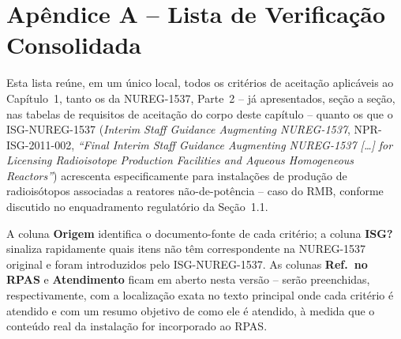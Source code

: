 \hypertarget{apA}{}%
\section*{Ap\^endice A -- Lista de Verifica\c{c}\~ao Consolidada}
\label{sec:apendice-a}

Esta lista re\'une, em um \'unico local, todos os crit\'erios de
aceita\c{c}\~ao aplic\'aveis ao Cap\'itulo~1, tanto os da NUREG-1537,
Parte~2 \citep{nureg1537p2} -- j\'a apresentados, se\c{c}\~ao a se\c{c}\~ao,
nas tabelas de requisitos de aceita\c{c}\~ao do corpo deste cap\'itulo --
quanto os que o ISG-NUREG-1537 (\emph{Interim Staff Guidance Augmenting
NUREG-1537}, NPR-ISG-2011-002, \emph{``Final Interim Staff Guidance
Augmenting NUREG-1537 [\ldots] for Licensing Radioisotope Production
Facilities and Aqueous Homogeneous Reactors''})
acrescenta especificamente para instala\c{c}\~oes de produ\c{c}\~ao de
radiois\'otopos associadas a reatores n\~ao-de-pot\^encia -- caso do RMB,
conforme discutido no enquadramento regulat\'orio da Se\c{c}\~ao~1.1.

A coluna \textbf{Origem} identifica o documento-fonte de cada crit\'erio;
a coluna \textbf{ISG?} sinaliza rapidamente quais itens n\~ao t\^em
correspondente na NUREG-1537 original e foram introduzidos pelo ISG-NUREG-1537.
As colunas \textbf{Ref.\ no RPAS} e \textbf{Atendimento} ficam em aberto
nesta vers\~ao -- ser\~ao preenchidas, respectivamente, com a
localiza\c{c}\~ao exata no texto principal onde cada crit\'erio \'e
atendido e com um resumo objetivo de como ele \'e atendido, \`a medida
que o conte\'udo real da instala\c{c}\~ao for incorporado ao RPAS.

